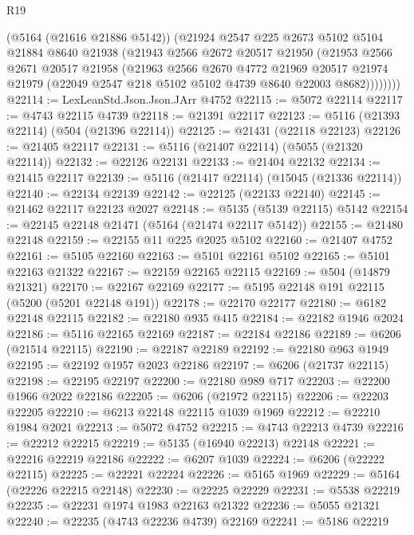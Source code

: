 \begin{lexlean}{R19}
\begin{coremodule}
{{{{{{{{{{{          (@5164 (@21616 @21886 @5142))
          (@21924
            @2547
            @225
            @2673
            @5102
            @5104
            @21884
            @8640
            @21938
            (@21943
              @2566
              @2672
              @20517
              @21950
              (@21953
                @2566
                @2671
                @20517
                @21958
                (@21963
                  @2566
                  @2670
                  @4772
                  @21969
                  @20517
                  @21974
                  @21979
                  (@22049 @2547 @218 @5102 @5102 @4739 @8640 @22003 @8682))))))))
@22114 := LexLeanStd.Json.Json.JArr @4752
@22115 := @5072 @22114
@22117 := @4743 @22115 @4739
@22118 := @21391 @22117
@22123 := @5116 (@21393 @22114) (@504 (@21396 @22114))
@22125 := @21431 (@22118 @22123)
@22126 := @21405 @22117
@22131 := @5116 (@21407 @22114) (@5055 (@21320 @22114))
@22132 := @22126 @22131
@22133 := @21404 @22132
@22134 := @21415 @22117
@22139 := @5116 (@21417 @22114) (@15045 (@21336 @22114))
@22140 := @22134 @22139
@22142 := @22125 (@22133 @22140)
@22145 := @21462 @22117 @22123 @2027
@22148 := @5135 (@5139 @22115) @5142
@22154 := @22145 @22148 @21471 (@5164 (@21474 @22117 @5142))
@22155 := @21480 @22148
@22159 := @22155 @11 @225 @2025 @5102
@22160 := @21407 @4752
@22161 := @5105 @22160
@22163 := @5101 @22161 @5102
@22165 := @5101 @22163 @21322
@22167 := @22159 @22165 @22115
@22169 := @504 (@14879 @21321)
@22170 := @22167 @22169
@22177 := @5195 @22148 @191 @22115 (@5200 (@5201 @22148 @191))
@22178 := @22170 @22177
@22180 := @6182 @22148 @22115
@22182 := @22180 @935 @415
@22184 := @22182 @1946 @2024
@22186 := @5116 @22165 @22169
@22187 := @22184 @22186
@22189 := @6206 (@21514 @22115)
@22190 := @22187 @22189
@22192 := @22180 @963 @1949
@22195 := @22192 @1957 @2023 @22186
@22197 := @6206 (@21737 @22115)
@22198 := @22195 @22197
@22200 := @22180 @989 @717
@22203 := @22200 @1966 @2022 @22186
@22205 := @6206 (@21972 @22115)
@22206 := @22203 @22205
@22210 := @6213 @22148 @22115 @1039 @1969
@22212 := @22210 @1984 @2021
@22213 := @5072 @4752
@22215 := @4743 @22213 @4739
@22216 := @22212 @22215
@22219 := @5135 (@16940 @22213) @22148
@22221 := @22216 @22219 @22186
@22222 := @6207 @1039
@22224 := @6206 (@22222 @22115)
@22225 := @22221 @22224
@22226 := @5165 @1969
@22229 := @5164 (@22226 @22215 @22148)
@22230 := @22225 @22229
@22231 := @5538 @22219
@22235 := @22231 @1974 @1983 @22163 @21322
@22236 := @5055 @21321
@22240 := @22235 (@4743 @22236 @4739) @22169
@22241 := @5186 @22219
}}}}}}}}}}}
\end{coremodule}
\end{lexlean}
